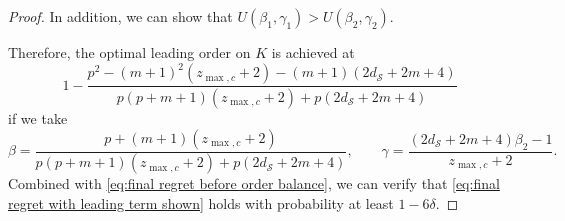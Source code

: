 \documentclass[final,supplement]{siamart251216}
\begin{document}
\begin{proof}
In addition, we can show that $U(\beta_{1},\gamma_{1})>U(\beta_{2},\gamma_{2})$. 


Therefore, the optimal leading order on $K$ is achieved at
\[
1-\frac{p^{2}-(m+1)^{2}(z_{\max,c}+2)-(m+1)(2d_{\mathcal{S}}+2m+4)}{p(p+m+1)(z_{\max,c}+2)+p(2d_{\mathcal{S}}+2m+4)}
\]
if we take
\[
\beta=\frac{p+(m+1)(z_{\max,c}+2)}{p(p+m+1)(z_{\max,c}+2)+p(2d_{\mathcal{S}}+2m+4)},
\qquad
\gamma=\frac{(2d_{\mathcal{S}}+2m+4)\beta_{2}-1}{z_{\max,c}+2}.
\]
Combined with \eqref{eq:final regret before order balance}, we can verify that \eqref{eq:final regret with leading term shown} holds with probability at least $1-6\delta$. 
\end{proof}




\end{document}
